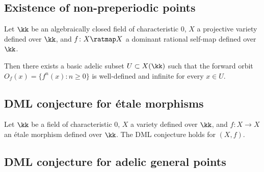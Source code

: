 \subsection{Existence of non-preperiodic points}

    \begin{theorem}\label{thm:Amerik11_existence_of_nonpreperiodic_points}
        Let \(\kk\) be an algebraically closed field of characteristic \(0\), \(X\) a projective variety defined over \(\kk\), and \(f \colon X \ratmap X\) a dominant rational self-map defined over \(\kk\).

        Then there exists a basic adelic subset \(U \subset X(\kk)\) such that the forward orbit \(O_f(x) = \{ f^n(x) : n \geq 0 \}\) is well-defined and infinite for every \(x \in U\).
    \end{theorem}

\subsection{DML conjecture for \'etale morphisms}

    \begin{theorem}\label{thm:BGT10_DML_for_etale_morphisms}
        Let \(\kk\) be a field of characteristic \(0\), \(X\) a variety defined over \(\kk\), and \(f \colon X \to X\) an \'etale morphism defined over \(\kk\).
        The DML conjecture holds for \((X,f)\).
    \end{theorem}

\subsection{DML conjecture for adelic general points}
